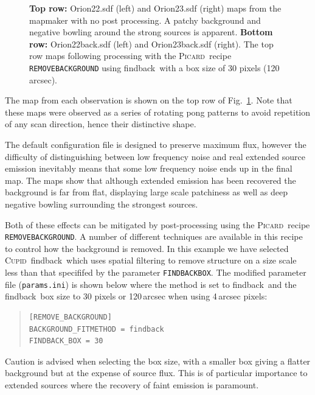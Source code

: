 \documentclass[twoside,11pt]{article}
\newcommand{\xref}[3]{#1}
\renewcommand{\_}{\texttt{\symbol{95}}}
\newenvironment{myquote}{\begin{quote}\begin{small}}{\end{small}\end{quote}}
\newcommand{\cupid}{\xref{\textsc{Cupid}}{sun255}{}}
\newcommand{\picard}{\xref{\textsc{Picard}}{sun231}{}}
\newcommand{\drrecipe}[1]{\texttt{#1}}
\newcommand{\task}[1]{\textsf{#1}}
\newcommand{\param}[1]{\texttt{#1}}
\newcommand{\findback}{\xref{\task{findback}}{sun255}{FINDBACK}}
\begin{document}
\begin{figure}
\begin{center}
\caption{\textbf{Top row:} Orion22.sdf (left) and Orion23.sdf (right) maps from
  the mapmaker with no post processing. A patchy background and
  negative bowling around the strong sources is apparent. \textbf{Bottom row:}
  Orion22\_back.sdf (left) and Orion23\_back.sdf (right). The top row
  maps following processing with the \picard\ recipe \drrecipe{REMOVE\_BACKGROUND}
  using \findback\ with a box size of 30 pixels (120\,arcsec).}
\label{fig:orionmakemap}
\end{center}
\end{figure}

The map from each observation is shown on the top row of
Fig.~\ref{fig:orionmakemap}. Note that these maps were observed as a
series of rotating pong patterns to avoid repetition of any scan
direction, hence their distinctive shape.

The default configuration file is designed to preserve maximum flux,
however the difficulty of distinguishing between low frequency noise
and real extended source emission inevitably means that some low
frequency noise ends up in the final map. The maps show that although
extended emission has been recovered the background is far from flat,
displaying large scale patchiness as well as deep negative bowling
surrounding the strongest sources.

Both of these effects can be mitigated by post-processing
using the \picard\ recipe \drrecipe{REMOVE\_BACKGROUND}. A number of
different techniques are available in this recipe to control how the
background is removed.  In this example we have selected \cupid\
\findback\ which uses spatial filtering to remove structure on a size
scale less than that specififed by the
parameter \param{FINDBACK\_BOX}.  The modified parameter file
(\texttt{params.ini}) is shown below where the method is set to
\findback\ and the \findback\ box size to 30 pixels or 120\,arcsec
when using 4\,arcsec pixels:

\begin{myquote}
\begin{verbatim}
[REMOVE_BACKGROUND]
BACKGROUND_FITMETHOD = findback
FINDBACK_BOX = 30
\end{verbatim}
\end{myquote}

Caution is advised when selecting the box size, with a smaller box
giving a flatter background but at the expense of source flux. This is
of particular importance to extended sources where the recovery of
faint emission is paramount.
\end{document}
